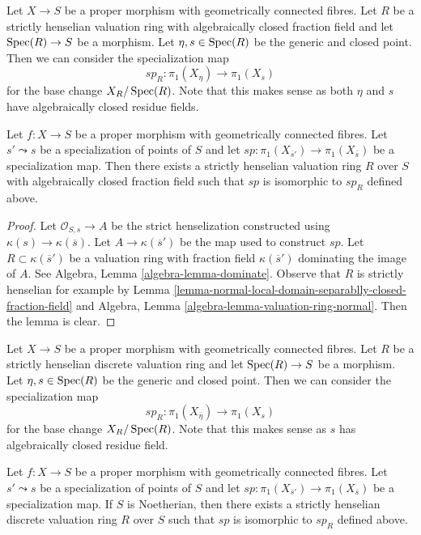 \noindent
Let $X \to S$ be a proper morphism with geometrically connected fibres.
Let $R$ be a strictly henselian valuation ring with algebraically
closed fraction field and let $\mathop{\mathrm{Spec}}(R) \to S$
be a morphism. Let $\eta, s \in \mathop{\mathrm{Spec}}(R)$ be the generic and closed point.
Then we can consider the specialization map
$$
sp_R : \pi_1(X_\eta) \to \pi_1(X_s)
$$
for the base change $X_R/\mathop{\mathrm{Spec}}(R)$. Note that this makes sense as both
$\eta$ and $s$ have algebraically closed residue fields.

\begin{lemma}
\label{lemma-specialization-map-valuation-ring}
Let $f : X \to S$ be a proper morphism with geometrically connected fibres.
Let $s' \leadsto s$ be a specialization of points of $S$ and let
$sp : \pi_1(X_{\overline{s}'}) \to \pi_1(X_{\overline{s}})$
be a specialization map. Then there exists a strictly henselian
valuation ring $R$ over $S$ with algebraically closed fraction field
such that $sp$ is isomorphic to $sp_R$ defined above.
\end{lemma}

\begin{proof}
Let $\mathcal{O}_{S, s} \to A$ be the strict henselization
constructed using $\kappa(s) \to \kappa(\overline{s})$.
Let $A \to \kappa(\overline{s}')$ be the map used to construct $sp$.
Let $R \subset \kappa(\overline{s}')$ be a valuation ring with
fraction field $\kappa(\overline{s}')$ dominating the image of $A$.
See Algebra, Lemma \ref{algebra-lemma-dominate}.
Observe that $R$ is strictly henselian for example by
Lemma \ref{lemma-normal-local-domain-separablly-closed-fraction-field}
and Algebra, Lemma \ref{algebra-lemma-valuation-ring-normal}.
Then the lemma is clear.
\end{proof}

\noindent
Let $X \to S$ be a proper morphism with geometrically connected fibres.
Let $R$ be a strictly henselian discrete valuation ring and let
$\mathop{\mathrm{Spec}}(R) \to S$ be a morphism. Let $\eta, s \in \mathop{\mathrm{Spec}}(R)$ be the
generic and closed point. Then we can consider the specialization map
$$
sp_R : \pi_1(X_{\overline{\eta}}) \to \pi_1(X_s)
$$
for the base change $X_R/\mathop{\mathrm{Spec}}(R)$. Note that this makes sense as $s$
has algebraically closed residue field.

\begin{lemma}
\label{lemma-specialization-map-discrete-valuation-ring}
Let $f : X \to S$ be a proper morphism with geometrically connected fibres.
Let $s' \leadsto s$ be a specialization of points of $S$ and let
$sp : \pi_1(X_{\overline{s}'}) \to \pi_1(X_{\overline{s}})$
be a specialization map. If $S$ is Noetherian, then
there exists a strictly henselian
discrete valuation ring $R$ over $S$ such that $sp$ is isomorphic to $sp_R$
defined above.
\end{lemma}

